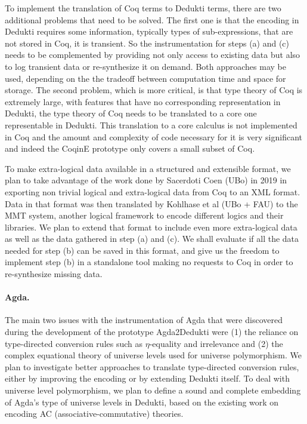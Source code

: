 To implement the translation of Coq terms to Dedukti terms, there are
two additional problems that need to be solved. The first one is that
the encoding in Dedukti requires some information, typically types of
sub-expressions, that are not stored in Coq, it is transient. So the
instrumentation for steps (a) and (c) needs to be complemented by
providing not only access to existing data but also to log transient
data or re-synthesize it on demand. Both approaches may be used,
depending on the the tradeoff between computation time and space for
storage. The second problem, which is more critical, is that type
theory of Coq is extremely large, with features that have no
corresponding representation in Dedukti, the type theory of Coq needs
to be translated to a core one representable in Dedukti.  This
translation to a core calculus is not implemented in Coq and the
amount and complexity of code necessary for it is very significant and
indeed the CoqinE prototype only covers a small subset of Coq.

To make extra-logical data available in a structured and extensible
format, we plan to take advantage of the work done by Sacerdoti Coen
(UBo) in 2019 in exporting non trivial logical and extra-logical data
from Coq to an XML format. Data in that format was then translated by
Kohlhase et al (UBo + FAU) to the MMT system, another logical
framework to encode different logics and their libraries. We plan to
extend that format to include even more extra-logical data as well as
the data gathered in step (a) and (c). We shall evaluate if all the
data needed for step (b) can be saved in this format, and give us the
freedom to implement step (b) in a standalone tool making no requests
to Coq in order to re-synthesize missing data.



\paragraph{Agda.}
The main two issues with the instrumentation of Agda that were
discovered during the development of the prototype Agda2Dedukti were
(1) the reliance on type-directed conversion rules such as
$\eta$-equality and irrelevance and (2) the complex equational theory
of universe levels used for universe polymorphism. We plan to
investigate better approaches to translate type-directed conversion
rules, either by improving the encoding or by extending Dedukti
itself. To deal with universe level polymorphism, we plan to define a
sound and complete embedding of Agda's type of universe levels in
Dedukti, based on the existing work on encoding AC
(associative-commutative) theories.

